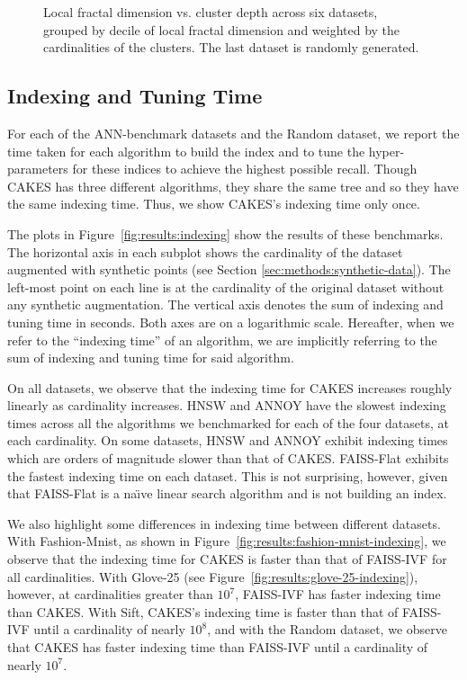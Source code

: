 \begin{figure}
\begin{subfigure}[b]{0.47\textwidth}
        \label{fig:results:random-lfd}
    \end{subfigure}
    \vspace{1em}
    \caption{Local fractal dimension vs. cluster depth across six datasets, grouped by decile of local fractal dimension and weighted by the cardinalities of the clusters.
    The last dataset is randomly generated.}
    \label{fig:results:lfd-plots}
\end{figure}


\subsection{Indexing and Tuning Time}
\label{sec:results:indexing-and-tuning-time}

For each of the ANN-benchmark datasets and the Random dataset, we report the time taken for each algorithm to build the index and to tune the hyper-parameters for these indices to achieve the highest possible recall.
Though CAKES has three different algorithms, they share the same tree and so they have the same indexing time.
Thus, we show CAKES's indexing time only once.

The plots in Figure~\ref{fig:results:indexing} show the results of these benchmarks.
The horizontal axis in each subplot shows the cardinality of the dataset augmented with synthetic points (see Section \ref{sec:methods:synthetic-data}).
The left-most point on each line is at the cardinality of the original dataset without any synthetic augmentation.
The vertical axis denotes the sum of indexing and tuning time in seconds.
Both axes are on a logarithmic scale.
Hereafter, when we refer to the ``indexing time'' of an algorithm, we are implicitly referring to the sum of indexing and tuning time for said algorithm.

On all datasets, we observe that the indexing time for CAKES increases roughly linearly as cardinality increases.
HNSW and ANNOY have the slowest indexing times across all the algorithms we benchmarked for each of the four datasets, at each cardinality. 
On some datasets, HNSW and ANNOY exhibit indexing times which are orders of magnitude slower than that of CAKES.
FAISS-Flat exhibits the fastest indexing time on each dataset. 
This is not surprising, however, given that FAISS-Flat is a na\"{\i}ve linear search algorithm and is not building an index.

We also highlight some differences in indexing time between different datasets.
With Fashion-Mnist, as shown in Figure~\ref{fig:results:fashion-mnist-indexing}, we observe that the indexing time for CAKES is faster than that of FAISS-IVF for all cardinalities.
With Glove-25 (see Figure~\ref{fig:results:glove-25-indexing}), however, at cardinalities greater than $10^7$, FAISS-IVF has faster indexing time than CAKES.
With Sift, CAKES's indexing time is faster than that of FAISS-IVF until a cardinality of nearly $10^8$, and with the Random dataset, we observe that CAKES has faster indexing time than FAISS-IVF until a cardinality of nearly $10^7$.


